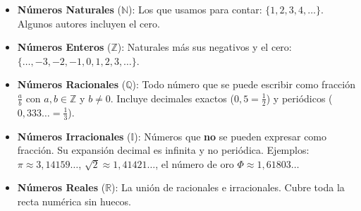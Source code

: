 \documentclass[12pt, a4paper]{article}
\begin{document}
\begin{cuadroteoria}
\begin{itemize}[leftmargin=*]
  \item \textbf{Números Naturales} ($\mathbb{N}$): Los que usamos para contar: $\{1, 2, 3, 4, \ldots\}$. Algunos autores incluyen el cero.
  \item \textbf{Números Enteros} ($\mathbb{Z}$): Naturales más sus negativos y el cero: $\{\ldots, -3, -2, -1, 0, 1, 2, 3, \ldots\}$.
  \item \textbf{Números Racionales} ($\mathbb{Q}$): Todo número que se puede escribir como fracción $\frac{a}{b}$ con $a, b \in \mathbb{Z}$ y $b \neq 0$. Incluye decimales exactos ($0{,}5 = \frac{1}{2}$) y periódicos ($0{,}333\ldots = \frac{1}{3}$).
  \item \textbf{Números Irracionales} ($\mathbb{I}$): Números que \textbf{no} se pueden expresar como fracción. Su expansión decimal es infinita y no periódica. Ejemplos: $\pi \approx 3{,}14159\ldots$, $\sqrt{2} \approx 1{,}41421\ldots$, el número de oro $\Phi \approx 1{,}61803\ldots$
  \item \textbf{Números Reales} ($\mathbb{R}$): La unión de racionales e irracionales. Cubre toda la recta numérica sin huecos.
\end{itemize}
\end{cuadroteoria}
\end{document}
